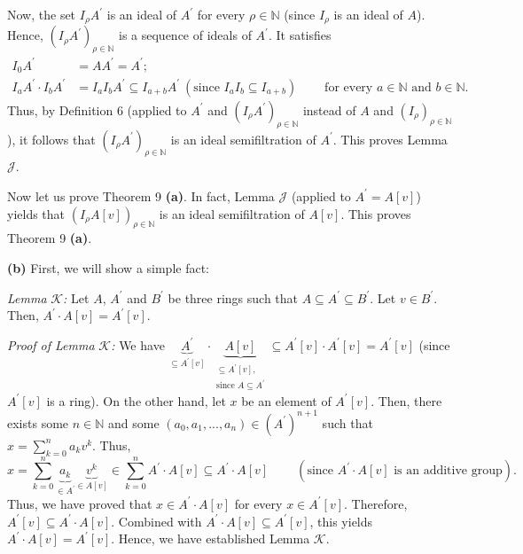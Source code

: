 \documentclass[12pt,final,notitlepage,onecolumn]{article}%
\begin{document}
Now, the set $I_{\rho}A^{\prime}$ is an ideal of $A^{\prime}$ for every
$\rho\in\mathbb{N}$ (since $I_{\rho}$ is an ideal of $A$). Hence, $\left(
I_{\rho}A^{\prime}\right)  _{\rho\in\mathbb{N}}$ is a sequence of ideals of
$A^{\prime}$. It satisfies%
\begin{align*}
I_{0}A^{\prime}  &  =AA^{\prime}=A^{\prime};\\
I_{a}A^{\prime}\cdot I_{b}A^{\prime}  &  =I_{a}I_{b}A^{\prime}\subseteq
I_{a+b}A^{\prime}\ \left(  \text{since }I_{a}I_{b}\subseteq I_{a+b}\right)
\ \ \ \ \ \ \ \ \ \ \text{for every }a\in\mathbb{N}\text{ and }b\in\mathbb{N}.
\end{align*}
Thus, by Definition 6 (applied to $A^{\prime}$ and $\left(  I_{\rho}A^{\prime
}\right)  _{\rho\in\mathbb{N}}$ instead of $A$ and $\left(  I_{\rho}\right)
_{\rho\in\mathbb{N}}$), it follows that $\left(  I_{\rho}A^{\prime}\right)
_{\rho\in\mathbb{N}}$ is an ideal semifiltration of $A^{\prime}$. This proves
Lemma $\mathcal{J}$.

Now let us prove Theorem 9 \textbf{(a)}. In fact, Lemma $\mathcal{J}$ (applied
to $A^{\prime}=A\left[  v\right]  $) yields that $\left(  I_{\rho}A\left[
v\right]  \right)  _{\rho\in\mathbb{N}}$ is an ideal semifiltration of
$A\left[  v\right]  $. This proves Theorem 9 \textbf{(a)}.

\textbf{(b)} First, we will show a simple fact:

\textit{Lemma }$\mathcal{K}$\textit{:} Let $A$, $A^{\prime}$ and $B^{\prime}$
be three rings such that $A\subseteq A^{\prime}\subseteq B^{\prime}$. Let
$v\in B^{\prime}$. Then, $A^{\prime}\cdot A\left[  v\right]  =A^{\prime
}\left[  v\right]  $.

\textit{Proof of Lemma }$\mathcal{K}$\textit{:} We have $\underbrace{A^{\prime
}}_{\subseteq A^{\prime}\left[  v\right]  }\cdot\underbrace{A\left[  v\right]
}_{\substack{\subseteq A^{\prime}\left[  v\right]  ,\\\text{since }A\subseteq
A^{\prime}}}\subseteq A^{\prime}\left[  v\right]  \cdot A^{\prime}\left[
v\right]  =A^{\prime}\left[  v\right]  $ (since $A^{\prime}\left[  v\right]  $
is a ring). On the other hand, let $x$ be an element of $A^{\prime}\left[
v\right]  $. Then, there exists some $n\in\mathbb{N}$ and some $\left(
a_{0},a_{1},...,a_{n}\right)  \in\left(  A^{\prime}\right)  ^{n+1}$ such that
$x=\sum\limits_{k=0}^{n}a_{k}v^{k}$. Thus,%
\[
x=\sum\limits_{k=0}^{n}\underbrace{a_{k}}_{\in A^{\prime}}\underbrace{v^{k}%
}_{\in A\left[  v\right]  }\in\sum\limits_{k=0}^{n}A^{\prime}\cdot A\left[
v\right]  \subseteq A^{\prime}\cdot A\left[  v\right]
\ \ \ \ \ \ \ \ \ \ \left(  \text{since }A^{\prime}\cdot A\left[  v\right]
\text{ is an additive group}\right)  .
\]
Thus, we have proved that $x\in A^{\prime}\cdot A\left[  v\right]  $ for every
$x\in A^{\prime}\left[  v\right]  $. Therefore, $A^{\prime}\left[  v\right]
\subseteq A^{\prime}\cdot A\left[  v\right]  $. Combined with $A^{\prime}\cdot
A\left[  v\right]  \subseteq A^{\prime}\left[  v\right]  $, this yields
$A^{\prime}\cdot A\left[  v\right]  =A^{\prime}\left[  v\right]  $. Hence, we
have established Lemma $\mathcal{K}$.
\end{document}
